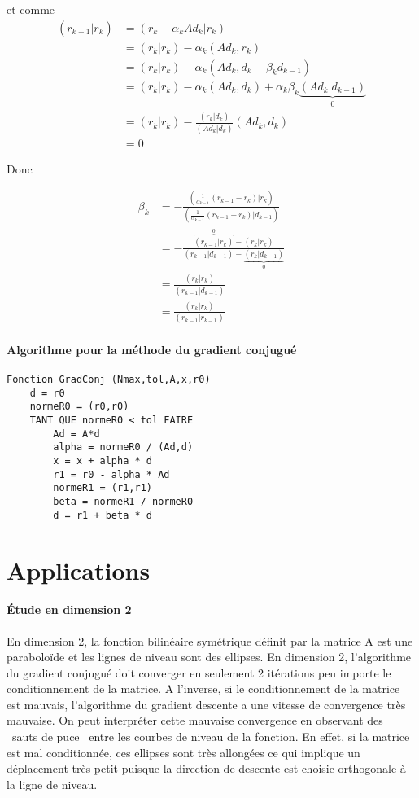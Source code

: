 \documentclass[french]{article}
\makeatletter
\providecommand{\og}{\leavevmode\flqq~}%
\providecommand{\fg}{\ifdim\lastskip>\z@\unskip\fi~\frqq}%
\makeatother
\begin{document}
et comme 
\begin{align}
(r_{k+1}|r_{k}) & =(r_{k}-\alpha_{k}Ad_{k}|r_{k})\nonumber \\
 & =(r_{k}|r_{k})-\alpha_{k}(Ad_{k},r_{k})\nonumber \\
 & =(r_{k}|r_{k})-\alpha_{k}(Ad_{k},d_{k}-\beta_{k}d_{k-1})\nonumber \\
 & =(r_{k}|r_{k})-\alpha_{k}(Ad_{k},d_{k})+\alpha_{k}\beta_{k}\underbrace{(Ad_{k}|d_{k-1})}_{0}\\
 & =(r_{k}|r_{k})-\frac{(r_{k}|d_{k})}{(Ad_{k}|d_{k})}(Ad_{k},d_{k})\nonumber \\
 & =0\nonumber 
\end{align}

Donc

\begin{align}
\beta_{k} & =-\frac{(\frac{1}{\alpha_{k-1}}(r_{k-1}-r_{k})|r_{k})}{(\frac{1}{\alpha_{k-1}}(r_{k-1}-r_{k})|d_{k-1})}\nonumber \\
 & =-\frac{\overbrace{(r_{k-1}|r_{k})}^{0}-(r_{k}|r_{k})}{(r_{k-1}|d_{k-1})-\underbrace{(r_{k}|d_{k-1})}_{0}}\\
 & =\frac{(r_{k}|r_{k})}{(r_{k-1}|d_{k-1})}\nonumber \\
 & =\frac{(r_{k}|r_{k})}{(r_{k-1}|r_{k-1})}\nonumber 
\end{align}


\subsection{Algorithme pour la méthode du gradient conjugué}

\begin{lstlisting}
Fonction GradConj (Nmax,tol,A,x,r0)
	d = r0
	normeR0 = (r0,r0)
	TANT QUE normeR0 < tol FAIRE
		Ad = A*d
		alpha = normeR0 / (Ad,d)
		x = x + alpha * d
		r1 = r0 - alpha * Ad
		normeR1 = (r1,r1)
		beta = normeR1 / normeR0
		d = r1 + beta * d 
\end{lstlisting}
\newpage{}

\part{Applications}

\subsection{Étude en dimension 2}

En dimension 2, la fonction bilinéaire symétrique définit par la matrice
A est une paraboloïde et les lignes de niveau sont des ellipses. En
dimension 2, l'algorithme du gradient conjugué doit converger en seulement
2 itérations peu importe le conditionnement de la matrice. A l'inverse,
si le conditionnement de la matrice est mauvais, l'algorithme du gradient
descente a une vitesse de convergence très mauvaise. On peut interpréter
cette mauvaise convergence en observant des \og sauts de puce\fg{}
entre les courbes de niveau de la fonction. En effet, si la matrice
est mal conditionnée, ces ellipses sont très allongées ce qui implique
un déplacement très petit puisque la direction de descente est choisie
orthogonale à la ligne de niveau.
\end{document}
